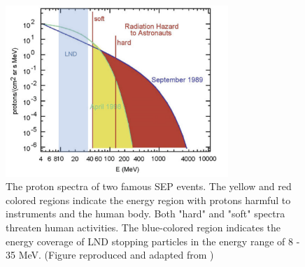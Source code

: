 \begin{figure}[!htb]
    \centering
    \includegraphics[width = 0.75\textwidth, height = 0.3\textheight]{images/SEP-radiation_hazard.png}
    \caption[The proton spectra in two \ac{SEP} events indicating the possible radiation energy]{The proton spectra of two famous \ac{SEP} events. The yellow and red colored regions indicate the energy region with protons harmful to instruments and the human body. Both "hard" and "soft" spectra threaten human activities. The blue-colored region indicates the energy coverage of \acs{LND} stopping particles in the energy range of 8 - 35 MeV. (Figure reproduced and adapted from \citet{Reames2021LNP})}
    \label{Fig:SEP-radiation_hazard}
\end{figure}






